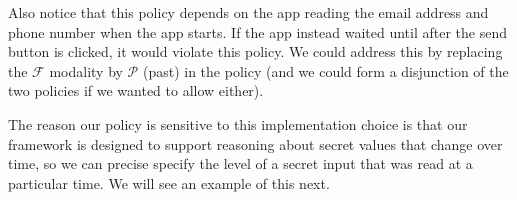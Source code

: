 \documentclass{entcs} \usepackage{entcsmacro}
\newcommand{\code}[1]{\text{\lstinline!#1!}}
\newcommand{\tfuture}{\mathcal{F}}
\newcommand{\tpast}{\mathcal{P}}
\begin{document}
Also notice that this policy depends on the app reading the email
address and phone number when the app starts. If the app instead
waited until after the send button is clicked, it would violate this
policy. We could address this by replacing the $\tfuture$ modality by
$\tpast$ (past) in the policy (and we could form a disjunction of the
two policies if we wanted to allow either).

The reason our policy is sensitive to this implementation choice is
that our framework is designed to support reasoning about secret
values that change over time, so we can precise specify the level of a
secret input that was read at a particular time. We will see an
example of this next.


\end{document}
